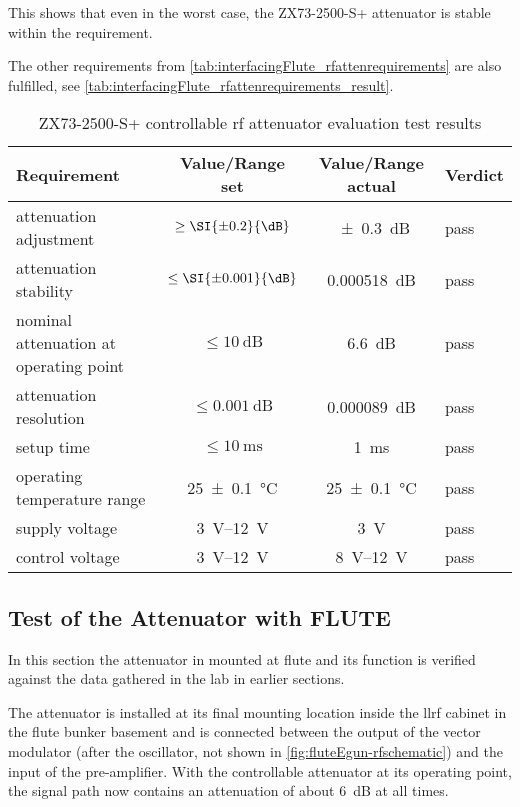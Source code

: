This shows that even in the worst case, the ZX73-2500-S+ attenuator is stable within the requirement.

The other requirements from \autoref{tab:interfacingFlute_rfattenrequirements} are also fulfilled, see \autoref{tab:interfacingFlute_rfattenrequirements_result}.

\begin{table}[tbh]
\caption[Evaluation results]{ZX73-2500-S+ controllable \gls{rf} attenuator evaluation test results}
\label{tab:interfacingFlute_rfattenrequirements_result}
\centering
\begin{tabular}{lccl}
	\toprule
	Requirement                            &      {Value/Range} set      &  {Value/Range} actual   & Verdict \\ \midrule
	attenuation adjustment                 &    $\ge\SI{\pm0.2}{\dB}$    &    \SI{\pm0.3}{\dB}     & pass    \\
	attenuation stability                  &   $\le\SI{\pm0.001}{\dB}$   &   \SI{0.000518}{\dB}    & pass    \\
	nominal attenuation at operating point &      $\le\SI{10}{\dB}$      &      \SI{6.6}{\dB}      & pass    \\
	attenuation resolution                 &    $\le\SI{0.001}{\dB}$     &   \SI{0.000089}{\dB}    & pass    \\
	setup time                             & $\le\SI{10}{\milli\second}$ &       \SI{1}{\ms}       & pass    \\
	operating temperature range            &   \SI{25\pm0.1}{\celsius}   & \SI{25\pm0.1}{\celsius} & pass    \\
	supply voltage                         &   \SIrange{3}{12}{\volt}    &      \SI{3}{\volt}      & pass    \\
	control voltage                        &   \SIrange{3}{12}{\volt}    & \SIrange{8}{12}{\volt}  & pass    \\ \bottomrule
\end{tabular}
\end{table}

\subsection{Test of the Attenuator with FLUTE}
In this section the attenuator in mounted at \gls{flute} and its function is verified against the data gathered in the lab in earlier sections.

The attenuator is installed at its final mounting location inside the \gls{llrf} cabinet in the \gls{flute} bunker basement and is connected between the output of the vector modulator (after the oscillator, not shown in \autoref{fig:fluteEgun-rfschematic}) and the input of the pre-amplifier. With the controllable attenuator at its operating point, the signal path now contains an attenuation of about \SI{6}{\dB} at all times.

